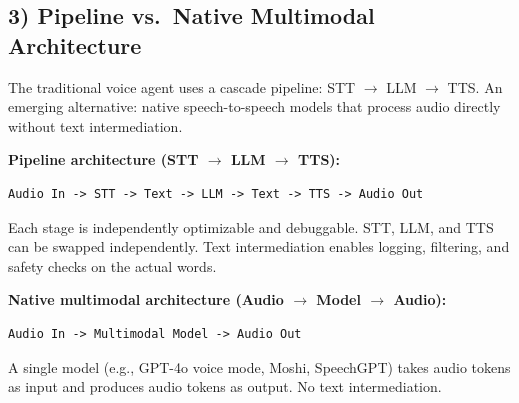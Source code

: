 \subsection*{3) Pipeline vs.\ Native Multimodal Architecture}

The traditional voice agent uses a cascade pipeline: STT $\rightarrow$ LLM $\rightarrow$ TTS. An emerging alternative: native speech-to-speech models that process audio directly without text intermediation.

\textbf{Pipeline architecture (STT $\rightarrow$ LLM $\rightarrow$ TTS):}

\begin{verbatim}
Audio In -> STT -> Text -> LLM -> Text -> TTS -> Audio Out
\end{verbatim}

Each stage is independently optimizable and debuggable. STT, LLM, and TTS can be swapped independently. Text intermediation enables logging, filtering, and safety checks on the actual words.

\textbf{Native multimodal architecture (Audio $\rightarrow$ Model $\rightarrow$ Audio):}

\begin{verbatim}
Audio In -> Multimodal Model -> Audio Out
\end{verbatim}

A single model (e.g., GPT-4o voice mode, Moshi, SpeechGPT) takes audio tokens as input and produces audio tokens as output. No text intermediation.

